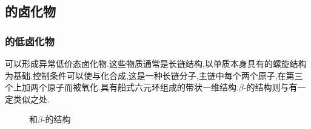 \documentclass{ctexart}
\begin{document}
\subsection{的卤化物}
\subsubsection{的低卤化物}
可以形成异常低价态卤化物.这些物质通常是长链结构,以单质本身具有的螺旋结构为基础.控制条件可以使与化合成,这是一种长链分子,主链中每个两个原子,在第三个上加两个原子而被氧化.具有船式六元环组成的带状一维结构.$\beta$-的结构则与有一定类似之处.
\begin{figure}[H]
    \centering
    \caption{和$\beta$-的结构}
\end{figure}
\end{document}
